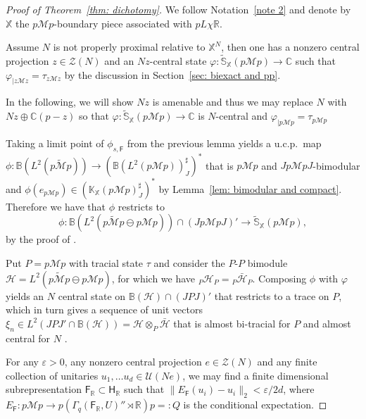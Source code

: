 \documentclass[a4paper,11pt]{amsart}
\theoremstyle{definition}
\newcommand{\B}{{\mathbb B}}
\newcommand{\C}{{\mathbb C}}
\newcommand{\K}{{\mathbb K}}
\newcommand{\R}{{\mathbb R}}
\newcommand{\bS}{{\mathbb S}}
\newcommand{\X}{{\mathbb X}}
\newcommand{\cH}{{\mathcal H}}
\newcommand{\cM}{{\mathcal M}}
\newcommand{\cU}{{\mathcal U}}
\newcommand{\cZ}{{\mathcal Z}}
\newcommand{\sH}{\mathsf{H}}
\newcommand{\sF}{\mathsf{F}}
\newcommand{\ot}{\otimes}
\begin{document}
\begin{proof}[Proof of Theorem~\ref{thm: dichotomy}]
We follow Notation~\ref{note 2} and denote by $\X$ the $p\cM p$-boundary piece associated with $pL\chi\R$.

Assume $N$ is not properly proximal relative to $\X^N$,
	then one has a nonzero central projection $z\in \cZ(N)$ and an $Nz$-central state
	$\varphi:\tilde \bS_{\X}(p\cM p)\to \C$ such that
	$\varphi_{\mid z \cM z}=\tau_{z\cM z}$ by the discussion in Section~\ref{sec: biexact and pp}.
	
In the following, we will show $Nz$ is amenable
	and thus we may replace $N$ with $Nz\oplus \C(p-z)$
	so that $\varphi:\tilde \bS_\X(p\cM p)\to \C$ is $N$-central and $\varphi_{\mid p\cM p}=\tau_{p\cM p}$

Taking a limit point of $\phi_{s, \sF}$ from the previous lemma yields a u.c.p.\ map $\phi: \B(L^2(p\tilde \cM p))\to (\B(L^2(p\cM p))^\sharp_J)^*$
	that is $p\cM p$ and $J p\cM pJ$-bimodular
	and $\phi(e_{p\cM p})\in (\K_\X(p\cM p)^\sharp_J)^*$ by Lemma~\ref{lem: bimodular and compact}.
Therefore we have that $\phi$ restricts to 
	$$\phi: \B(L^2(p\tilde \cM p\ominus p\cM p))\cap(J p\cM p J)'\to \tilde \bS_\X(p\cM p),$$
	by the proof of \cite[Proposition 9.1]{DKEP22}.

Put $P=p\cM p$ with tracial state $\tau$ and consider the $P$-$P$ bimodule $\cH=L^2(p\tilde \cM p\ominus p\cM p)$, 
	for which we have $_P \cH_P = {_P} \bar{\cH}_P$.
Composing $\phi$ with $\varphi$ yields an $N$ central state on $\B(\cH)\cap (JPJ)'$
	that restricts to a trace on $P$,
	which in turn gives a sequence of unit vectors $\xi_n\in L^2(JPJ'\cap \B(\cH))=\cH\ot _P \bar \cH$
	that is almost bi-tracial for $P$ and almost central for $N$ \cite[Proposition 2.4]{PoVa14a}.

For any $\varepsilon>0$, any nonzero central projection $e\in \cZ(N)$ and any finite collection of unitaries $u_1,\dots u_d\in \cU(Ne)$, 
	we may find a finite dimensional subrepresentation $\sF_\R\subset \sH_\R$
	such that $\|E_\sF(u_i)-u_i\|_2<\varepsilon/2d$, where $E_\sF: p\cM p\to p(\Gamma_q(\sF_\R, U)''\rtimes\R )p=:Q$
	is the conditional expectation. 


\end{proof}
\end{document}
